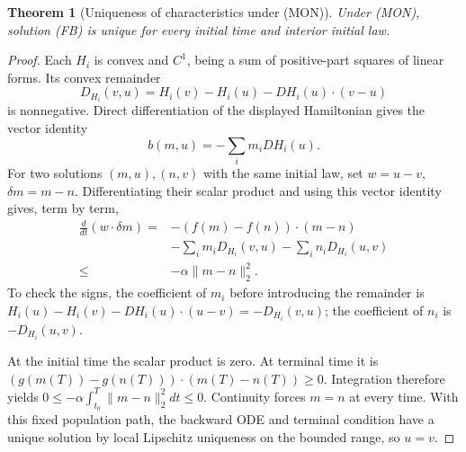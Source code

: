\documentclass[11pt,a4paper]{article}
\newtheorem{theorem}{Theorem}[section]
\theoremstyle{definition}
\theoremstyle{remark}
\begin{document}
\begin{theorem}[Uniqueness of characteristics under (MON)]
Under (MON), solution (FB) is unique for every initial time and interior initial law.
\end{theorem}
\begin{proof}
Each $H_i$ is convex and $C^1$, being a sum of positive-part squares of linear forms. Its convex remainder
\[
 D_{H_i}(v,u)=H_i(v)-H_i(u)-DH_i(u)\cdot(v-u)
\]
is nonnegative. Direct differentiation of the displayed Hamiltonian gives the vector identity
\[
 b(m,u)=-\sum_i m_i DH_i(u).
\]
For two solutions $(m,u),(n,v)$ with the same initial law, set $w=u-v$, $\delta m=m-n$. Differentiating their scalar product and using this vector identity gives, term by term,
\begin{align*}
 \frac d{dt}(w\cdot\delta m)
 ={}&-(f(m)-f(n))\cdot(m-n)\\
 &-\sum_i m_iD_{H_i}(v,u)-\sum_i n_iD_{H_i}(u,v)\\
 \leq{}&-\alpha\|m-n\|_2^2.
\end{align*}
To check the signs, the coefficient of $m_i$ before introducing the remainder is
$H_i(u)-H_i(v)-DH_i(u)\cdot(u-v)=-D_{H_i}(v,u)$;
the coefficient of $n_i$ is $-D_{H_i}(u,v)$.

At the initial time the scalar product is zero. At terminal time it is
$(g(m(T))-g(n(T)))\cdot(m(T)-n(T))\geq0$.
Integration therefore yields $0\leq-\alpha\int_{t_0}^T\|m-n\|_2^2dt\leq0$. Continuity forces $m=n$ at every time. With this fixed population path, the backward ODE and terminal condition have a unique solution by local Lipschitz uniqueness on the bounded range, so $u=v$.
\end{proof}
\end{document}
